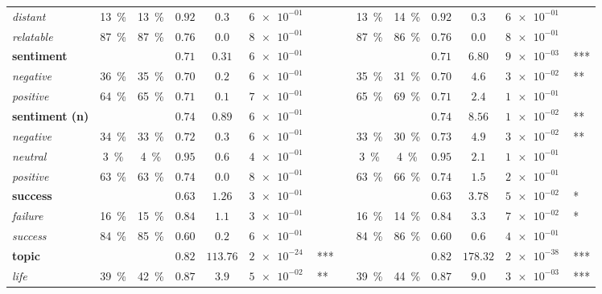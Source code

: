 \begin{tabular}{lccccr@{\hskip0pt}llccccr@{\hskip0pt}l}
\textit{distant} & \SI{13}{\percent} & \SI{13}{\percent} & $0.92$ & $0.3$ & $\SI{6e-01}{}$ &  && \SI{13}{\percent} & \SI{14}{\percent} & $0.92$ & $0.3$ & $\SI{6e-01}{}$ &  \\
\textit{relatable} & \SI{87}{\percent} & \SI{87}{\percent} & $0.76$ & $0.0$ & $\SI{8e-01}{}$ &  && \SI{87}{\percent} & \SI{86}{\percent} & $0.76$ & $0.0$ & $\SI{8e-01}{}$ &  \\
\midrule\textbf{sentiment} & & & $0.71$ & $0.31$ & $\SI{6e-01}{}$ &  && & & $0.71$ & $6.80$ & $\SI{9e-03}{}$ & *** \\
\textit{negative} & \SI{36}{\percent} & \SI{35}{\percent} & $0.70$ & $0.2$ & $\SI{6e-01}{}$ &  && \SI{35}{\percent} & \SI{31}{\percent} & $0.70$ & $4.6$ & $\SI{3e-02}{}$ & ** \\
\textit{positive} & \SI{64}{\percent} & \SI{65}{\percent} & $0.71$ & $0.1$ & $\SI{7e-01}{}$ &  && \SI{65}{\percent} & \SI{69}{\percent} & $0.71$ & $2.4$ & $\SI{1e-01}{}$ &  \\
\midrule\textbf{sentiment (n)} & & & $0.74$ & $0.89$ & $\SI{6e-01}{}$ &  && & & $0.74$ & $8.56$ & $\SI{1e-02}{}$ & ** \\
\textit{negative} & \SI{34}{\percent} & \SI{33}{\percent} & $0.72$ & $0.3$ & $\SI{6e-01}{}$ &  && \SI{33}{\percent} & \SI{30}{\percent} & $0.73$ & $4.9$ & $\SI{3e-02}{}$ & ** \\
\textit{neutral} & \SI{3}{\percent} & \SI{4}{\percent} & $0.95$ & $0.6$ & $\SI{4e-01}{}$ &  && \SI{3}{\percent} & \SI{4}{\percent} & $0.95$ & $2.1$ & $\SI{1e-01}{}$ &  \\
\textit{positive} & \SI{63}{\percent} & \SI{63}{\percent} & $0.74$ & $0.0$ & $\SI{8e-01}{}$ &  && \SI{63}{\percent} & \SI{66}{\percent} & $0.74$ & $1.5$ & $\SI{2e-01}{}$ &  \\
\midrule\textbf{success} & & & $0.63$ & $1.26$ & $\SI{3e-01}{}$ &  && & & $0.63$ & $3.78$ & $\SI{5e-02}{}$ & * \\
\textit{failure} & \SI{16}{\percent} & \SI{15}{\percent} & $0.84$ & $1.1$ & $\SI{3e-01}{}$ &  && \SI{16}{\percent} & \SI{14}{\percent} & $0.84$ & $3.3$ & $\SI{7e-02}{}$ & * \\
\textit{success} & \SI{84}{\percent} & \SI{85}{\percent} & $0.60$ & $0.2$ & $\SI{6e-01}{}$ &  && \SI{84}{\percent} & \SI{86}{\percent} & $0.60$ & $0.6$ & $\SI{4e-01}{}$ &  \\
\midrule\textbf{topic} & & & $0.82$ & $113.76$ & $\SI{2e-24}{}$ & *** && & & $0.82$ & $178.32$ & $\SI{2e-38}{}$ & *** \\
\textit{life} & \SI{39}{\percent} & \SI{42}{\percent} & $0.87$ & $3.9$ & $\SI{5e-02}{}$ & ** && \SI{39}{\percent} & \SI{44}{\percent} & $0.87$ & $9.0$ & $\SI{3e-03}{}$ & *** \\

\end{tabular}

